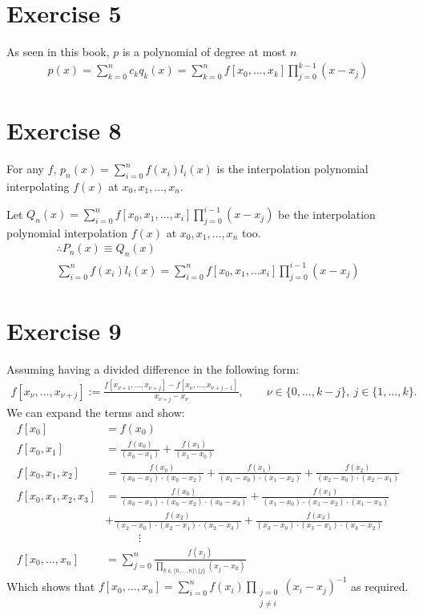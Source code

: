\section{Exercise 5}
As seen in this book, $p$ is a polynomial of degree at most $n$
\begin{gather*}
p(x) = \sum_{k=0}^n c_k q_k (x) = \sum_{k=0}^n f [ x_0 , \ldots,x_k ] \prod_{j=0}^{k-1} (x-x_j)
\end{gather*}
\section{Exercise 8}
For any $f$, $p_n(x) = \sum_{i = 0}^n f(x_i) l_i(x) $ is the interpolation polynomial interpolating $f(x)$ at $x_0 , x_1 , \ldots ,x_n$.

Let $Q_n(x) = \sum_{i = 0}^n f[x_0,x_1,\ldots,x_i] \prod_{j=0}^{i-1} (x - x_j)$ be the interpolation polynomial interpolation $f(x)$ at $x_0, x_1, \ldots ,x_n$ too.
\begin{gather*}
\therefore P_n(x) \equiv Q_n(x) \\
\sum_{i=0}^n f(x_i) l_i(x) = \sum_{i=0 }^n f [ x_0 , x_1 ,\ldots x_i ] \prod_{j=0}^{i-1}(x-x_j)
\end{gather*}
\section{Exercise 9}
Assuming having a divided difference in the following form:
\begin{gather*}
f[x_\nu,\ldots,x_{\nu+j}] := \frac{f[x_{\nu+1},\ldots , x_{\nu+j}] - f[x_\nu,\ldots , x_{\nu+j-1}]}{x_{\nu+j}-x_\nu}, \qquad \nu\in\{0,\ldots,k-j\},\ j\in\{1,\ldots,k\}.
\end{gather*}
We can expand the terms and show:
\begin{align*}
f[x_0] &= f(x_0) \\
f[x_0,x_1] &= \frac{f(x_0)}{(x_0-x_1)} + \frac{f(x_1)}{(x_1-x_0)} \\
f[x_0,x_1,x_2] &= \frac{f(x_0)}{(x_0-x_1)\cdot(x_0-x_2)} + \frac{f(x_1)}{(x_1-x_0)\cdot(x_1-x_2)} + \frac{f(x_2)}{(x_2-x_0)\cdot(x_2-x_1)} \\
f[x_0,x_1,x_2,x_3] &= \frac{f(x_0)}{(x_0-x_1)\cdot(x_0-x_2)\cdot(x_0-x_3)} + \frac{f(x_1)}{(x_1-x_0)\cdot(x_1-x_2)\cdot(x_1-x_3)} \\
&+ \frac{f(x_2)}{(x_2-x_0)\cdot(x_2-x_1)\cdot(x_2-x_3)} +\frac{f(x_3)}{(x_3-x_0)\cdot(x_3-x_1)\cdot(x_3-x_2)} \\
& \quad \quad\quad \vdots \\
f[x_0,\dots,x_n] &=
\sum_{j=0}^{n} \frac{f(x_j)}{\prod_{k\in\{0,\dots,n\}\setminus\{j\}} (x_j-x_k)}
\end{align*}
Which shows that $f[x_0,\dots,x_n] = \sum_{i=0}^{n} f(x_i) \prod_{\substack{j=0\\j\neq i}} (x_i - x_j)^{-1} $ as required.
